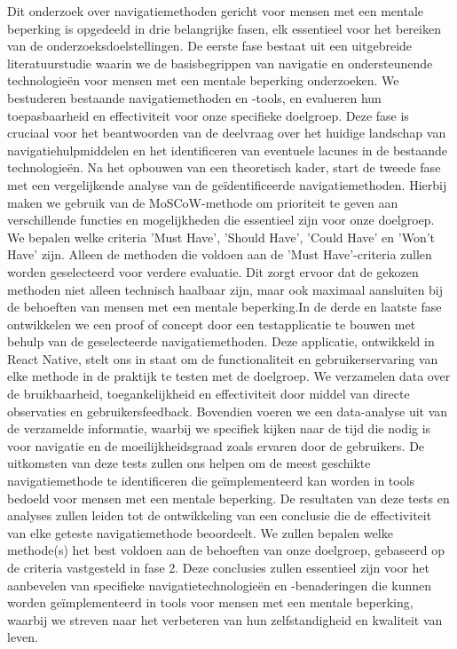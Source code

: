 Dit onderzoek over navigatiemethoden gericht voor mensen met een mentale beperking is opgedeeld in drie belangrijke fasen, elk essentieel voor het bereiken van de onderzoeksdoelstellingen. De eerste fase bestaat uit een uitgebreide literatuurstudie waarin we de basisbegrippen van navigatie en ondersteunende technologieën voor mensen met een mentale beperking onderzoeken. We bestuderen bestaande navigatiemethoden en -tools, en evalueren hun toepasbaarheid en effectiviteit voor onze specifieke doelgroep. Deze fase is cruciaal voor het beantwoorden van de deelvraag over het huidige landschap van navigatiehulpmiddelen en het identificeren van eventuele lacunes in de bestaande technologieën. Na het opbouwen van een theoretisch kader, start de tweede fase met een vergelijkende analyse van de geïdentificeerde navigatiemethoden. Hierbij maken we gebruik van de MoSCoW-methode om prioriteit te geven aan verschillende functies en mogelijkheden die essentieel zijn voor onze doelgroep. We bepalen welke criteria 'Must Have', 'Should Have', 'Could Have' en 'Won't Have' zijn. Alleen de methoden die voldoen aan de 'Must Have'-criteria zullen worden geselecteerd voor verdere evaluatie. Dit zorgt ervoor dat de gekozen methoden niet alleen technisch haalbaar zijn, maar ook maximaal aansluiten bij de behoeften van mensen met een mentale beperking.In de derde en laatste fase ontwikkelen we een proof of concept door een testapplicatie te bouwen met behulp van de geselecteerde navigatiemethoden. Deze applicatie, ontwikkeld in React Native, stelt ons in staat om de functionaliteit en gebruikerservaring van elke methode in de praktijk te testen met de doelgroep. We verzamelen data over de bruikbaarheid, toegankelijkheid en effectiviteit door middel van directe observaties en gebruikersfeedback. Bovendien voeren we een data-analyse uit van de verzamelde informatie, waarbij we specifiek kijken naar de tijd die nodig is voor navigatie en de moeilijkheidsgraad zoals ervaren door de gebruikers. De uitkomsten van deze tests zullen ons helpen om de meest geschikte navigatiemethode te identificeren die geïmplementeerd kan worden in tools bedoeld voor mensen met een mentale beperking. De resultaten van deze tests en analyses zullen leiden tot de ontwikkeling van een conclusie die de effectiviteit van elke geteste navigatiemethode beoordeelt. We zullen bepalen welke methode(s) het best voldoen aan de behoeften van onze doelgroep, gebaseerd op de criteria vastgesteld in fase 2. Deze conclusies zullen essentieel zijn voor het aanbevelen van specifieke navigatietechnologieën en -benaderingen die kunnen worden geïmplementeerd in tools voor mensen met een mentale beperking, waarbij we streven naar het verbeteren van hun zelfstandigheid en kwaliteit van leven.

